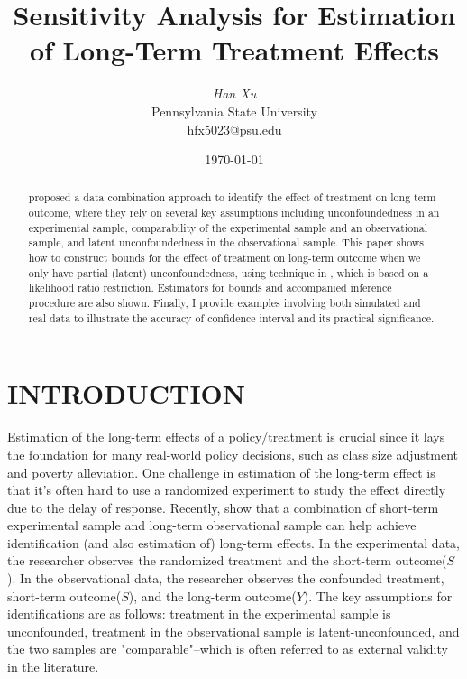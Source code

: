 \documentclass[12pt]{article}
\title{\bfseries\Large Sensitivity Analysis for Estimation of Long-Term Treatment Effects \vspace*{-1ex}}
\author{\large\textit{Han Xu} \\
	\large \textup{Pennsylvania State University}\\\textup{hfx5023@psu.edu}}
\date{\today}
\begin{document}
	
	\maketitle
	
	\begin{abstract}
	\textcite{athey2020combining} proposed a data combination approach to identify the effect of treatment on long term outcome, where they rely on several key assumptions including unconfoundedness in an experimental sample, comparability of the experimental sample and an observational sample, and latent unconfoundedness in the observational sample. This paper shows how to construct bounds for the effect of treatment on long-term outcome when we only have partial (latent) unconfoundedness, using technique in \textcite{yadlowsky2018bounds}, which is based on a likelihood ratio restriction. Estimators for bounds and accompanied inference procedure are also shown. Finally, I provide examples involving both simulated and real data to illustrate the accuracy of confidence interval and its practical significance.
	\end{abstract}

    \section{INTRODUCTION}
    
    Estimation of the long-term effects of a policy/treatment is crucial since it lays the foundation for many real-world policy decisions, such as class size adjustment and poverty alleviation. One challenge in estimation of the long-term effect is that it's often hard to use a randomized experiment to study the effect directly due to the delay of response. Recently, \textcite{athey2020combining} show that a combination of short-term experimental sample and long-term observational sample can help achieve identification (and also estimation of) long-term effects. In the experimental data, the researcher observes the randomized treatment and the short-term outcome($S$). In the observational data, the researcher observes the confounded treatment, short-term outcome($S$), and the long-term outcome($Y$). The key assumptions for identifications are as follows: treatment in the experimental sample is unconfounded, treatment in the observational sample is latent-unconfounded, and the two samples are "comparable"--which is often referred to as external validity in the literature.
	
\end{document}
